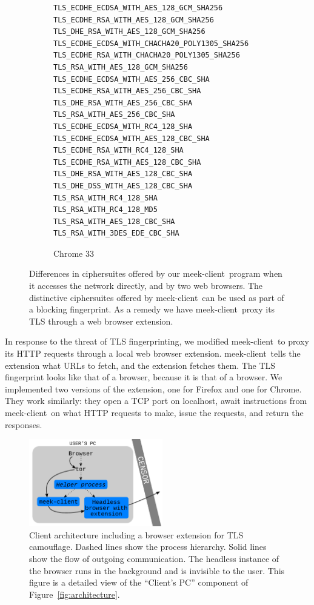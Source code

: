 \documentclass[conference]{IEEEtran}
\def\meekclient{\mbox{meek-client}}
\begin{document}
\begin{figure}
\begin{subfigure}[t]{0.30\textwidth}
\begin{minipage}[t][27ex][t]{0.30\textwidth}
\tiny
\begin{verbatim}
TLS_ECDHE_ECDSA_WITH_AES_128_GCM_SHA256
TLS_ECDHE_RSA_WITH_AES_128_GCM_SHA256
TLS_DHE_RSA_WITH_AES_128_GCM_SHA256
TLS_ECDHE_ECDSA_WITH_CHACHA20_POLY1305_SHA256
TLS_ECDHE_RSA_WITH_CHACHA20_POLY1305_SHA256
TLS_RSA_WITH_AES_128_GCM_SHA256
TLS_ECDHE_ECDSA_WITH_AES_256_CBC_SHA
TLS_ECDHE_RSA_WITH_AES_256_CBC_SHA
TLS_DHE_RSA_WITH_AES_256_CBC_SHA
TLS_RSA_WITH_AES_256_CBC_SHA
TLS_ECDHE_ECDSA_WITH_RC4_128_SHA
TLS_ECDHE_ECDSA_WITH_AES_128_CBC_SHA
TLS_ECDHE_RSA_WITH_RC4_128_SHA
TLS_ECDHE_RSA_WITH_AES_128_CBC_SHA
TLS_DHE_RSA_WITH_AES_128_CBC_SHA
TLS_DHE_DSS_WITH_AES_128_CBC_SHA
TLS_RSA_WITH_RC4_128_SHA
TLS_RSA_WITH_RC4_128_MD5
TLS_RSA_WITH_AES_128_CBC_SHA
TLS_RSA_WITH_3DES_EDE_CBC_SHA
\end{verbatim}
\end{minipage}
\caption{Chrome 33}
\label{fig:ciphersuites:chrome}
\end{subfigure}

\caption{Differences in ciphersuites offered by
our \meekclient\ program when it accesses the network directly,
and by two web browsers.
The distinctive ciphersuites offered by \meekclient\ can be used as part of a blocking fingerprint.
As a remedy we have \meekclient\ proxy its TLS through a web browser extension.
}
\label{fig:ciphersuites}
\end{figure}

In response to the threat of TLS fingerprinting,
we modified \meekclient\ to proxy its HTTP requests through a local web browser extension.
\meekclient\ tells the extension what URLs to fetch, and the extension fetches them.
The TLS fingerprint looks like that of a browser, because it is that of a browser.
We implemented two versions of the extension, one for Firefox and one for Chrome.
They work similarly: they open a TCP port on localhost,
await instructions from \meekclient\ on what HTTP requests to make,
issue the requests, and return the responses.

\begin{figure}
\centering
\includegraphics[height=1.5in]{browser-architecture}
\caption{
Client architecture including a browser extension for TLS camouflage.
Dashed lines show the process hierarchy.
Solid lines show the flow of outgoing communication.
The headless instance of the browser runs in the background and is invisible to the user.
This figure is a detailed view of the ``Client's PC'' component of Figure~\ref{fig:architecture}.
}
\label{fig:browser-architecture}
\end{figure}
\end{document}
